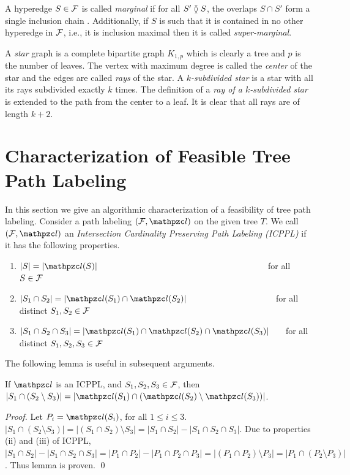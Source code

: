 \documentclass[MS]             %
              {iitmdiss_as}    %
\begin{document}
A hyperedge $S \in {\cal F}$ is called {\em marginal} if for all $S'
\between S$, the overlaps $S \cap S'$ form a single inclusion chain
\cite{kklv10}. Additionally, if $S$ is such that it is contained in no
other hyperedge in ${\cal F}$, i.e., it is inclusion maximal then it is called
{\em super-marginal}.

A {\em star} graph is a complete bipartite graph $K_{1,p}$
which is clearly a tree and $p$ is the number of leaves. The vertex
with maximum degree is called the {\em center} of the star and the
edges are called {\em rays} of the star. A {\em $k$-subdivided star}
is a star with all its rays subdivided exactly $k$ times. The
definition of a {\em ray of a $k$-subdivided star} is extended to the path
from the center to a leaf. It is clear that all rays are of length $k+2$.




\section{Characterization of Feasible Tree Path  Labeling} 
\label{sec:feasible} 

In this section we give an algorithmic characterization of a
feasibility of tree path labeling.  Consider a path labeling $(\cF,
\cl)$ on the given tree $T$. We call $(\cF, \cl)$ an {\em Intersection
  Cardinality Preserving Path Labeling (ICPPL)} if it has the
following properties.

\begin{enumerate}[{(\icpplpr\ }i) \ \ \ ]
\item \label{pr:i} $|S| = |\cl(S)|$ \ \ \ \ \ \ \ \ \ \ \ \ \ \ \ \ \
  \ \ \ \ \ \ \ \ \ \ \ \ \ \ \ \ \ \ \ \ \ \ for all $S \in {\cal F}$
\item \label{pr:ii}$|S_1 \cap S_2| = |\cl(S_1) \cap \cl(S_2)|$ \ \ \ \
  \ \ \ \ \ \ \ \ \ \ \ \ \ \ \ \ for all distinct $S_1, S_2 \in {\cal F}$
\item \label{pr:iii}$|S_1 \cap S_2 \cap S_3| = |\cl(S_1) \cap \cl(S_2)
  \cap \cl(S_3)|$ \ \ \ for all distinct $S_1, S_2, S_3 \in {\cal F}$
\end{enumerate}


The following lemma is useful in subsequent arguments. 
\begin{lemma}
  \label{lem:setminuscard}
  If $\cl$ is an ICPPL, and $S_1, S_2, S_3 \in {\cal F}$, then $|S_1 \cap
  (S_2 \setminus S_3)| = |\cl(S_1) \cap (\cl(S_2) \setminus
  \cl(S_3))|$.
\end{lemma}
\begin{proof}%
  Let $P_i = \cl(S_i)$, for all $1 \le i \le  3$.
  $|S_1 \cap (S_2 \setminus S_3)| = |(S_1 \cap S_2) \setminus S_3| =
  |S_1 \cap S_2| - |S_1 \cap S_2 \cap S_3|$. Due to properties (ii)
  and (iii) of ICPPL, $|S_1 \cap S_2| - |S_1 \cap S_2 \cap S_3| = |P_1
  \cap P_2| - |P_1 \cap P_2 \cap P_3| = |(P_1 \cap P_2) \setminus P_3|
  = |P_1 \cap (P_2 \setminus P_3)|$. Thus lemma is proven. \qed
\end{proof}
\end{document}
